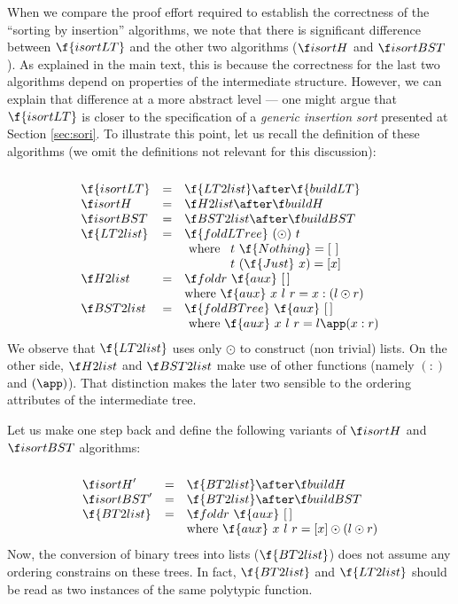 \documentclass[a4paper,11pt]{llncs}
\begin{document}
When we compare the proof effort required to establish the correctness
of the ``sorting by insertion'' algorithms, we note that there is
significant difference between $\f{isortLT}$ and the other two
algorithms ($\isortH$ and $\isortBST$). As explained in the main text,
this is because the correctness for the last two algorithms depend on
properties of the intermediate structure. However, we can explain that
difference at a more abstract level --- one might argue that
$\f{isortLT}$ is closer to the specification of a \emph{generic
  insertion sort} presented at Section \ref{sec:sori}. To illustrate
this point, let us recall the definition of these algorithms (we omit
the definitions not relevant for this discussion):
\[
\begin{array}{l}\\
\begin{array}{lcl}
\f{isortLT}  & = & \f{LT2list} \after \f{buildLT}\\ 
\isortH  & = & \H2list \after \buildH\\ 
\isortBST  & = & \BST2list \after \buildBST\\
\f{LT2list} & = & \f{foldLTree}\ (\odot)\ t\\
&& \mbox{ where } 
\begin{array}[t]{l}
t\ \f{Nothing} = [\ ]\\
t\ (\f{Just}\ x) = [x]
\end{array}\\
\H2list & = & \foldr\ \f{aux}\ \Nil \\ 
&& \mbox{where } \f{aux}\ x\ l\ r = x:(l \odot r)\\
\BST2list & = & \f{foldBTree}\ \f{aux}\ \Nil\\
&& \mbox{ where } \f{aux}\ x\ l\ r = l \app (x:r)
\end{array}
\end{array}
\]
\noindent We observe that $\f{LT2list}$ uses only $\odot$ to construct
(non trivial) lists. On the other side, $\H2list$ and $\BST2list$ make
use of other functions (namely $(:)$ and $(\app)$). That distinction
makes the later two sensible to the ordering attributes of the
intermediate tree.

Let us make one step back and define the following variants of
$\isortH$ and $\isortBST$ algorithms: \def\BT2list{\f{BT2list}}
\[
\begin{array}{l}\\
\begin{array}{lcl}
\isortH'  & = & \BT2list \after \buildH\\ 
\isortBST'  & = & \BT2list \after \buildBST\\ 
\BT2list & = & \foldr\ \f{aux}\ \Nil \\ 
&& \mbox{where } \f{aux}\ x\ l\ r = [x]\odot (l \odot r)\\
\end{array}
\end{array}
\]
Now, the conversion of binary trees into lists ($\BT2list$) does not assume any
ordering constrains on these trees. In fact, $\BT2list$ and $\f{LT2list}$
should be read as two instances of the same polytypic function.
\end{document}
